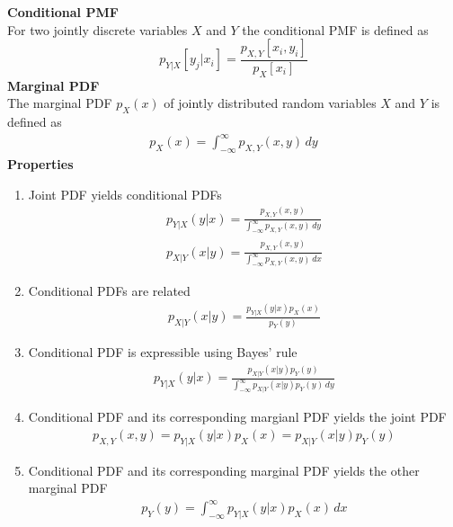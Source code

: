 \documentclass[12pt,a4paper]{report}
\author{Frederik Appel Vardinghus-Nielsen}
\begin{document}
\noindent\textbf{Conditional PMF}\\
For two jointly discrete variables $X$ and $Y$ the conditional PMF is defined as
\begin{equation}
p_{Y|X}[y_j|x_i]=\frac{p_{X,Y}[x_i,y_i]}{p_X[x_i]}
\end{equation}
\textbf{Marginal PDF}\\
The marginal PDF $p_X(x)$ of jointly distributed random variables $X$ and $Y$ is defined as
\begin{align*}
p_X(x)=\int_{-\infty}^{\infty}\!p_{X,Y}(x,y)\,dy
\end{align*}
\textbf{Properties}
\begin{enumerate}
\item Joint PDF yields conditional PDFs
\begin{align*}
p_{Y|X}(y|x)=\frac{p_{X,Y}(x,y)}{\int_{-\infty}^{\infty}\!p_{X,Y}(x,y)\,dy}\\
p_{X|Y}(x|y)=\frac{p_{X,Y}(x,y)}{\int_{-\infty}^{\infty}\!p_{X,Y}(x,y)\,dx}
\end{align*}
\item Conditional PDFs are related
\begin{align*}
p_{X|Y}(x|y)=\frac{p_{Y|X}(y|x)p_X(x)}{p_Y(y)}
\end{align*}
\item Conditional PDF is expressible using Bayes' rule
\begin{align*}	
p_{Y|X}(y|x)=\frac{p_{X|Y}(x|y)p_Y(y)}{\int_{-\infty}^{\infty}\!p_{X|Y}(x|y)p_Y(y)\,dy}
\end{align*}
\item Conditional PDF and its corresponding margianl PDF yields the joint PDF
\begin{align*}
p_{X,Y}(x,y)=p_{Y|X}(y|x)p_X(x)=p_{X|Y}(x|y)p_Y(y)
\end{align*}
\item Conditional PDF and its corresponding marginal PDF yields the other marginal PDF
\begin{align*}
p_Y(y)=\int_{-\infty}^{\infty}\!p_{Y|X}(y|x)p_X(x)\,dx
\end{align*}














\end{enumerate}
\end{document}
